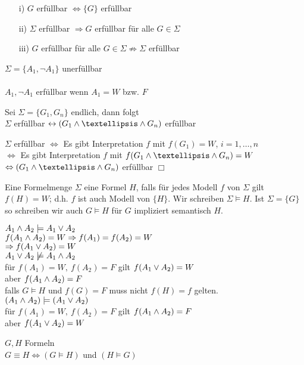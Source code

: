 \beweis{}
\begin{enumerate}
\item[i)] $G$ erfüllbar $\Leftrightarrow \{G\}$ erfüllbar
\item[ii)] $\Sigma$ erfüllbar $\Rightarrow G$ erfüllbar für alle $G \in \Sigma$
\item[iii)] $G$ erfüllbar für alle $G \in \Sigma \not \Rightarrow \Sigma$ erfüllbar
\end{enumerate}
$\Sigma = \{A_1, \neg A_1 \}$ unerfüllbar\\
\noindent\\
$A_1, \neg A_1$ erfüllbar wenn $A_1 = W$ bzw. $F$

Sei $\Sigma = \{G_1, G_n \}$ endlich, dann folgt\\
$\Sigma$ erfüllbar $\leftrightarrow (G_1 \AND … \AND G_n)$ erfüllbar

\beweis{}
$\Sigma$ erfüllbar $\Leftrightarrow$ Es gibt Interpretation $f$ mit $f(G_1) = W$, $i=1, …, n$\\
$\Leftrightarrow$ Es gibt Interpretation $f$ mit $f(G_1 \AND … \AND G_n) = W$\\
$\Leftrightarrow ( G_1 \AND … \AND G_n)$ erfüllbar $\Box$

Eine Formelmenge $\Sigma$  eine Formel $H$, falls für jedes Modell $f$ von $\Sigma$ gilt $f(H) = W$; d.h. $f$ ist auch Modell von $\{H\}$. Wir schreiben $\Sigma \models H$. Ist $\Sigma = \{G\}$ so schreiben wir auch $G \models H $ für $G$ impliziert semantisch $H$.

\beispiel{}
$A_1 \wedge A_2 \models A_1 \vee A_2$\\
$f(A_1 \wedge A_2) = W \Rightarrow f(A_1) = f(A_2) = W$\\
$\Rightarrow f(A_1 \vee A_2) = W$\\
$A_1 \vee A_2 \not \models A_1 \wedge A_2$\\

\noindent
für $f(A_1) = W,\ f(A_2) = F$ gilt $f(A_1 \vee A_2) = W$\\
aber $f(A_1 \wedge A_2) = F$\\
falls $G \models H$ und $f(G) = F$ muss nicht $f(H) = f$ gelten.\\
$(A_1 \wedge A_2) \models (A_1 \vee A_2)$\\
für $f(A_1) = W,\ f(A_2)=F$ gilt $f(A_1 \wedge A_2) = F$\\
aber $f(A_1 \vee A_2 ) = W$

\bemerkung{}
$G, H$ Formeln\\
$G \equiv H \Leftrightarrow ( G \models H)$ und $(H \models G)$\\


